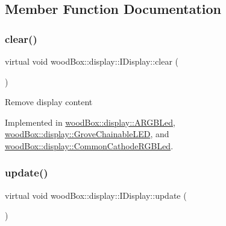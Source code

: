\subsection{Member Function Documentation}
\mbox{\label{classwood_box_1_1display_1_1_i_display_a7030f0768c1ef15ce936a259406168dc}} 
\subsubsection{\texorpdfstring{clear()}{clear()}}
{\footnotesize\ttfamily virtual void wood\+Box\+::display\+::\+I\+Display\+::clear (\begin{DoxyParamCaption}{ }\end{DoxyParamCaption})\hspace{0.3cm}{\ttfamily [pure virtual]}}

Remove display content 

Implemented in \mbox{\hyperlink{classwood_box_1_1display_1_1_a_r_g_b_led_a01eeaee1bbb439e81f5f9bc536c04df7}{wood\+Box\+::display\+::\+A\+R\+G\+B\+Led}}, \mbox{\hyperlink{classwood_box_1_1display_1_1_grove_chainable_l_e_d_a1c42c42ee9643aa914ab20a191e4adfd}{wood\+Box\+::display\+::\+Grove\+Chainable\+L\+ED}}, and \mbox{\hyperlink{classwood_box_1_1display_1_1_common_cathode_r_g_b_led_a4ae3f4b7e03751dd6352adfa1b90fca0}{wood\+Box\+::display\+::\+Common\+Cathode\+R\+G\+B\+Led}}.

\mbox{\label{classwood_box_1_1display_1_1_i_display_ad8c0811b8b807ce119a06c7806004de7}} 
\subsubsection{\texorpdfstring{update()}{update()}}
{\footnotesize\ttfamily virtual void wood\+Box\+::display\+::\+I\+Display\+::update (\begin{DoxyParamCaption}{ }\end{DoxyParamCaption})\hspace{0.3cm}{\ttfamily [pure virtual]}}

